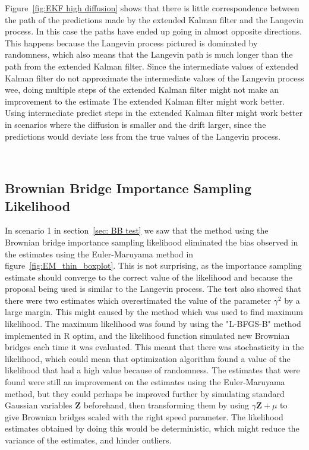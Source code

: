 Figure~\ref{fig:EKF high diffusion} shows that there is little correspondence between the path of the predictions made by the extended Kalman filter and the Langevin process. In this case the paths have ended up going in almost opposite directions. This happens because the Langevin process pictured is dominated by randomness, which also means that the Langevin path is much longer than the path from the extended Kalman filter. Since the intermediate values of extended Kalman filter do not approximate the intermediate values of the Langevin process wee, doing multiple steps of the extended Kalman filter might not make an improvement to the estimate
The extended Kalman filter might work better. Using intermediate predict steps in the extended Kalman filter might work better in scenarios where the diffusion is smaller and the drift larger, since the predictions would deviate less from the true values of the Langevin process.

\


\subsection{Brownian Bridge Importance Sampling Likelihood}
\label{subsec: brownian bridge interpretation}
In scenario 1 in section~\ref{sec: BB test} we saw that the method using the Brownian bridge importance sampling likelihood eliminated the bias observed in the estimates using the Euler-Maruyama method in figure~\ref{fig:EM_thin_boxplot}. This is not surprising, as the importance sampling estimate should converge to the correct value of the likelihood and because the proposal being used is similar to the Langevin process. The test also showed that there were two estimates which overestimated the value of the parameter $\gamma^2$ by a large margin. This might caused by the method which was used to find maximum likelihood. The maximum likelihood was found by using the "L-BFGS-B" method implemented in R optim, and the likelihood function simulated new Brownian bridges each time it was evaluated. This meant that there was stochasticity in the likelihood, which could mean that optimization algorithm found a value of the likelihood that had a high value because of randomness. The estimates that were found were still an improvement on the estimates using the Euler-Maruyama method, but they could perhaps be improved further by simulating standard Gaussian variables $\textbf{Z}$ beforehand, then transforming them by using $\gamma \textbf{Z} +\mu$ to give Brownian bridges scaled with the right speed parameter. The likelihood estimates obtained by doing this would be deterministic, which might reduce the variance of the estimates, and hinder outliers.

